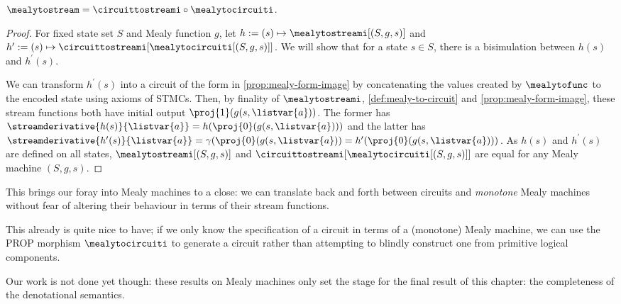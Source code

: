 \begin{theorem}\label{thm:mealy-to-circuit}
    \(
        \mealytostream = \circuittostreami \circ \mealytocircuiti
    \).
\end{theorem}
\begin{proof}
    For fixed state set \(S\) and Mealy function \(g\), let
    \(h := (s) \mapsto \mealytostreami[(S, g, s)]\) and \(
        h^\prime := (s) \mapsto \circuittostreami[\mealytocircuiti[(S, g, s)]]
    \).
    We will show that for a state \(s \in S\), there is a bisimulation
    between \(h(s)\) and \(h^\prime(s)\).

    We can transform \(h^\prime(s)\) into a circuit of the form in
    \cref{prop:mealy-form-image} by concatenating the values created by
    \(\mealytofunc\) to the encoded state using axioms of STMCs.
    Then, by finality of \(\mealytostreami\), \cref{def:mealy-to-circuit} and
    \cref{prop:mealy-form-image}, these stream functions both have initial output \(
        \proj{1}(g(s, \listvar{a}))
    \).
    The former has \(
        \streamderivative{h(s)}{\listvar{a}} = h(\proj{0}(g(s, \listvar{a})))
    \) and the latter has \(
        \streamderivative{h^\prime(s)}{\listvar{a}} =
            \gamma(\proj{0}(g(s, \listvar{a})) =
            h^\prime(\proj{0}(g(s, \listvar{a})))
    \).
    As \(h(s)\) and \(h^\prime(s)\) are defined on all states,
    \(\mealytostreami[(S, g, s)]\) and
    \(\circuittostreami[\mealytocircuiti[(S, g, s)]]\) are equal for any Mealy
    machine \((S, g, s)\).
\end{proof}


This brings our foray into Mealy machines to a close: we can translate back and
forth between circuits and \emph{monotone} Mealy machines without fear of
altering their behaviour in terms of their stream functions.

This already is quite nice to have; if we only know the specification of a
circuit in terms of a (monotone) Mealy machine, we can use the PROP morphism
\(\mealytocircuiti\) to generate a circuit rather than attempting to blindly
construct one from primitive logical components.

Our work is not done yet though: these results on Mealy machines only set the
stage for the final result of this chapter: the completeness of
the denotational semantics.